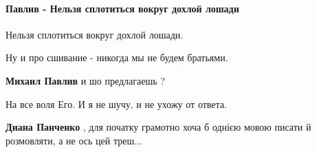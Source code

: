  
 
 
 
 
\paragraph{Павлив - Нельзя сплотиться вокруг дохлой лошади}
\label{sec:31_07_2021.fb.panchenko_diana.1.oko_za_oko.cmt.pavliv_dohlaja_loshadj}

\begin{itemize}

					

Нельзя сплотиться вокруг дохлой лошади.

Ну и про сшивание - никогда мы не будем братьями.

\begin{itemize}
 
\textbf{Михаил Павлив} и шо предлагаешь ?

 

На все воля Его. И я не шучу, и не ухожу от ответа.

 
\textbf{Диана Панченко} , для початку грамотно хоча б однією мовою писати й розмовляти, а не ось цей треш...


 

\end{itemize}
\end{itemize}
